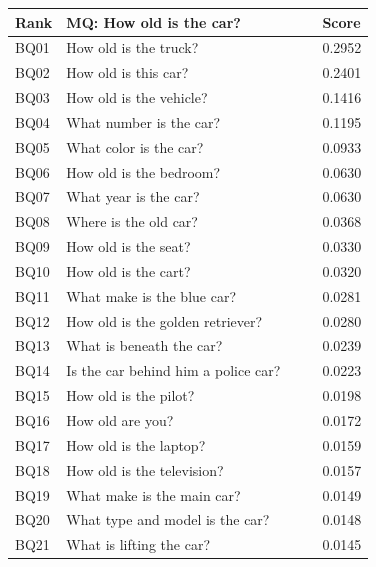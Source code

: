 \documentclass[letterpaper]{article}
\begin{document}
\begin{table}
	\begin{subtable}{0.49\linewidth}
		\begin{tabular}{l|l|l}
			Rank & MQ: How old is the car?                 & Score  \\
			\hline
			BQ01 & How old is the truck?                   & 0.2952 \\
			BQ02 & How old is this car?                    & 0.2401 \\
			BQ03 & How old is the vehicle?                 & 0.1416 \\
			BQ04 & What number is the car?                 & 0.1195 \\
			BQ05 & What color is the car?                  & 0.0933 \\
			BQ06 & How old is the bedroom?                 & 0.0630 \\
			BQ07 & What year is the car?                   & 0.0630 \\
			BQ08 & Where is the old car?                   & 0.0368 \\
			BQ09 & How old is the seat?                    & 0.0330 \\
			BQ10 & How old is the cart?                    & 0.0320 \\
			BQ11 & What make is the blue car?              & 0.0281 \\
			BQ12 & How old is the golden retriever?        & 0.0280 \\
			BQ13 & What is beneath the car?                & 0.0239 \\
			BQ14 & Is the car behind him a police car?~~~~ & 0.0223 \\
			BQ15 & How old is the pilot?                   & 0.0198 \\
			BQ16 & How old are you?                        & 0.0172 \\
			BQ17 & How old is the laptop?                  & 0.0159 \\
			BQ18 & How old is the television?              & 0.0157 \\
			BQ19 & What make is the main car?              & 0.0149 \\
			BQ20 & What type and model is the car?         & 0.0148 \\
			BQ21 & What is lifting the car?                & 0.0145 \\
		\end{tabular}
	\end{subtable}
	\begin{subtable}{0.49\linewidth}

\end{subtable}
\end{table}
\end{document}
